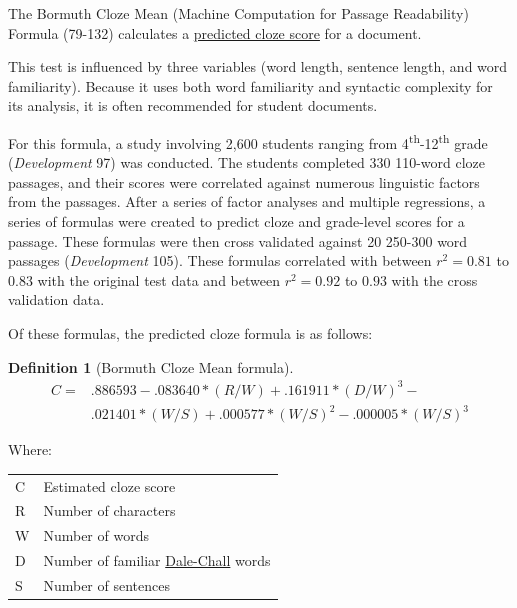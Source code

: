 \documentclass[
]{book}
\theoremstyle{definition}
\newtheorem{definition}{Definition}[chapter]
\theoremstyle{definition}
\theoremstyle{definition}
\theoremstyle{definition}
\theoremstyle{remark}
\begin{document}
The Bormuth Cloze Mean (Machine Computation for Passage Readability) Formula (79-132) calculates a \protect\hyperlink{cloze}{predicted cloze score} for a document.

This test is influenced by three variables (word length, sentence length, and word familiarity). Because it uses both word familiarity and syntactic complexity for its analysis, it is often recommended for student documents.

For this formula, a study involving 2,600 students ranging from 4\textsuperscript{th}-12\textsuperscript{th} grade (\emph{Development} 97) was conducted. The students completed 330 110-word cloze passages, and their scores were correlated against numerous linguistic factors from the passages. After a series of factor analyses and multiple regressions, a series of formulas were created to predict cloze and grade-level scores for a passage. These formulas were then cross validated against 20 250-300 word passages (\emph{Development} 105). These formulas correlated with between \(r^2 = 0.81\) to \(0.83\) with the original test data and between \(r^2 = 0.92\) to \(0.93\) with the cross validation data.

Of these formulas, the predicted cloze formula is as follows:

\begin{definition}[Bormuth Cloze Mean formula]
\protect\hypertarget{def:bormuthcloze}{}{\label{def:bormuthcloze} {} }\begin{align*}
  C = & .886593 - .083640*(R/W) + .161911*(D/W)^3 - \\
      & .021401*(W/S) + .000577*(W/S)^2 - .000005*(W/S)^3
\end{align*}
\end{definition}

Where:

\begin{longtable}[]{@{}
  >{\raggedright\arraybackslash}p{}
  >{\raggedright\arraybackslash}p{}@{}}
\toprule
\endhead
C & Estimated cloze score \\
R & Number of characters \\
W & Number of words \\
D & Number of familiar \protect\hyperlink{dale-chall-test}{Dale-Chall} words \\
S & Number of sentences \\
\bottomrule
\end{longtable}
\end{document}
